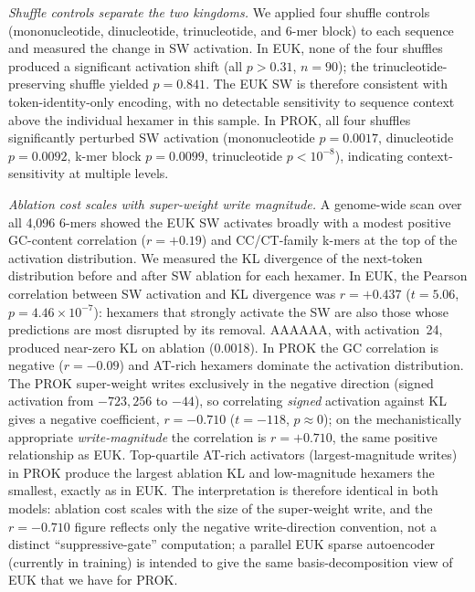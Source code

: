 \documentclass[11pt]{article}
\begin{document}
\textit{Shuffle controls separate the two kingdoms.}
We applied four shuffle controls (mononucleotide, dinucleotide,
trinucleotide, and 6-mer block) to each sequence and measured the
change in SW activation. In EUK, none of the four shuffles produced
a significant activation shift (all $p > 0.31$, $n = 90$); the
trinucleotide-preserving shuffle yielded $p = 0.841$. The EUK SW is
therefore consistent with token-identity-only encoding, with no
detectable sensitivity to sequence context above the individual
hexamer in this sample. In PROK, all four shuffles significantly
perturbed SW activation (mononucleotide $p = 0.0017$, dinucleotide
$p = 0.0092$, k-mer block $p = 0.0099$, trinucleotide $p < 10^{-8}$),
indicating context-sensitivity at multiple levels.

\textit{Ablation cost scales with super-weight write magnitude.}
A genome-wide scan over all 4{,}096 6-mers showed the EUK SW
activates broadly with a modest positive GC-content correlation
($r = +0.19$) and CC/CT-family k-mers at the top of the activation
distribution. We measured the KL divergence of the next-token
distribution before and after SW ablation for each hexamer. In EUK,
the Pearson correlation between SW activation and KL divergence was
$r = +0.437$ ($t = 5.06$, $p = 4.46 \times 10^{-7}$): hexamers that
strongly activate the SW are also those whose predictions are most
disrupted by its removal. AAAAAA, with activation~24, produced
near-zero KL on ablation (0.0018). In PROK the GC correlation is
negative ($r = -0.09$) and AT-rich hexamers dominate the activation
distribution. The PROK super-weight writes exclusively in the
negative direction (signed activation from $-723{,}256$ to $-44$),
so correlating \emph{signed} activation against KL gives a negative
coefficient, $r = -0.710$ ($t = -118$, $p \approx 0$); on the
mechanistically appropriate \emph{write-magnitude} the correlation is
$r = +0.710$, the same positive relationship as EUK.
Top-quartile AT-rich activators (largest-magnitude writes) in PROK
produce the largest ablation KL and low-magnitude hexamers the
smallest, exactly as in EUK. The interpretation is therefore identical
in both models: ablation cost scales with the size of the
super-weight write, and the $r = -0.710$ figure reflects only the
negative write-direction convention, not a distinct
``suppressive-gate'' computation; a parallel EUK sparse
autoencoder (currently in training) is intended to give the same
basis-decomposition view of EUK that we have for PROK.
\end{document}
